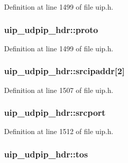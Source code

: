 Definition at line 1499 of file uip.h.

\hypertarget{structuip__udpip__hdr_a51bbbe3099c10ef26119ddc2aa51e35e}{
\subsubsection[{proto}]{ {\bf uip\_\-udpip\_\-hdr::proto}}}
\label{structuip__udpip__hdr_a51bbbe3099c10ef26119ddc2aa51e35e}


Definition at line 1499 of file uip.h.

\hypertarget{structuip__udpip__hdr_aa80e8d0fc768525fa3bfb3d4e4cf260d}{
\subsubsection[{srcipaddr}]{ {\bf uip\_\-udpip\_\-hdr::srcipaddr}\mbox{[}2\mbox{]}}}
\label{structuip__udpip__hdr_aa80e8d0fc768525fa3bfb3d4e4cf260d}


Definition at line 1507 of file uip.h.

\hypertarget{structuip__udpip__hdr_ab20096ae4953caaa42f6bb2373c4494c}{
\subsubsection[{srcport}]{ {\bf uip\_\-udpip\_\-hdr::srcport}}}
\label{structuip__udpip__hdr_ab20096ae4953caaa42f6bb2373c4494c}


Definition at line 1512 of file uip.h.

\hypertarget{structuip__udpip__hdr_aed119a030ebd3bf7c30a12071c27d441}{
\subsubsection[{tos}]{ {\bf uip\_\-udpip\_\-hdr::tos}}}
\label{structuip__udpip__hdr_aed119a030ebd3bf7c30a12071c27d441}


